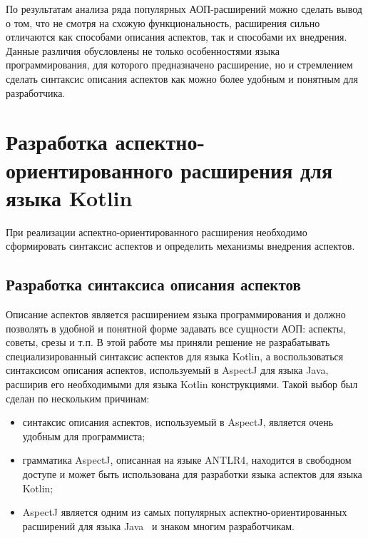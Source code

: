 \documentclass[conference]{IEEEtran}
\begin{document}

По результатам анализа ряда популярных АОП-расширений можно сделать вывод о том,
что не смотря на схожую функциональность, расширения сильно отличаются как
способами описания аспектов, так и способами их внедрения.
Данные различия обусловлены не только особенностями языка
программирования, для которого предназначено расширение, но и стремлением
сделать синтаксис описания аспектов как можно более удобным и понятным для
разработчика.


\section{Разработка аспектно-ориентированного расширения для языка Kotlin}

При реализации аспектно-ориентированного расширения необходимо сформировать
синтаксис аспектов и определить механизмы внедрения аспектов.

\subsection{Разработка синтаксиса описания аспектов}

Описание аспектов является расширением языка программирования и должно позволять
в удобной и понятной форме задавать все сущности АОП: аспекты, советы, срезы и
т.п.
В этой работе мы приняли решение не разрабатывать специализированный синтаксис 
аспектов для языка Kotlin, а воспользоваться синтаксисом описания аспектов,
используемый в AspectJ для языка Java, расширив его необходимыми для языка
Kotlin конструкциями.
Такой выбор был сделан по нескольким причинам:
\begin{itemize}
	\item синтаксис описания аспектов, используемый в AspectJ, является очень
		  удобным для программиста;
	\item грамматика AspectJ, описанная на языке ANTLR4, находится
		  в свободном доступе и может быть использована для разработки
		  языка аспектов для языка Kotlin;
	\item AspectJ является одним из самых популярных аспектно-ориентированных
		  расширений для языка Java~\cite{aspect_review} и знаком многим
		  разработчикам.
\end{itemize}
\end{document}
